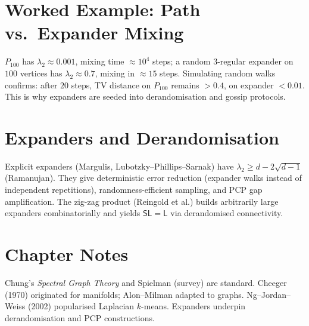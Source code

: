 \section{Worked Example: Path vs.\ Expander Mixing}
\label{sec:mixing-example}

$P_{100}$ has $\lambda_2\approx0.001$, mixing time $\approx10^4$ steps; a random $3$-regular expander on $100$ vertices has $\lambda_2\approx0.7$, mixing in $\approx15$ steps. Simulating random walks confirms: after $20$ steps, TV distance on $P_{100}$ remains $>0.4$, on expander $<0.01$. This is why expanders are seeded into derandomisation and gossip protocols.

\section{Expanders and Derandomisation}
\label{sec:expanders}

Explicit expanders (Margulis, Lubotzky--Phillips--Sarnak) have $\lambda_2\ge d-2\sqrt{d-1}$ (Ramanujan). They give deterministic error reduction (expander walks instead of independent repetitions), randomness-efficient sampling, and PCP gap amplification. The zig-zag product (Reingold et al.) builds arbitrarily large expanders combinatorially and yields $\mathsf{SL}=\mathsf{L}$ via derandomised connectivity.

\section{Chapter Notes}
Chung's \emph{Spectral Graph Theory} and Spielman (survey) are standard. Cheeger (1970) originated for manifolds; Alon--Milman adapted to graphs. Ng--Jordan--Weiss (2002) popularised Laplacian $k$-means. Expanders underpin derandomisation and PCP constructions.

